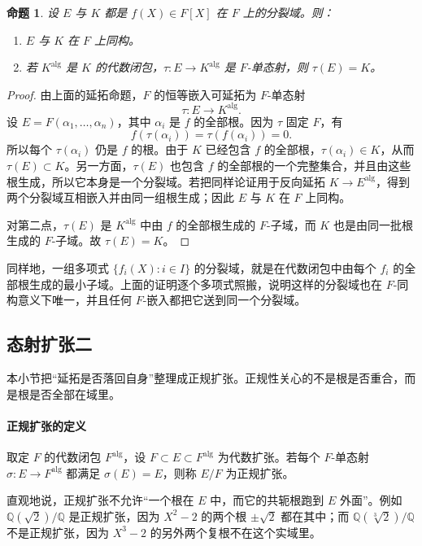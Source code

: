 \documentclass[11pt,a4paper,openany]{ctexbook}
\numberwithin{equation}{chapter}
\newcommand{\Q}{\mathbb{Q}}
\theoremstyle{plain}
\newtheorem{proposition}[theorem]{命题}
\theoremstyle{definition}
\theoremstyle{remark}
\begin{document}
\begin{proposition}
设 $E$ 与 $K$ 都是 $f(X)\in F[X]$ 在 $F$ 上的分裂域。则：
\begin{enumerate}[label=(\arabic*)]
\item $E$ 与 $K$ 在 $F$ 上同构。
\item 若 $K^{\mathrm{alg}}$ 是 $K$ 的代数闭包，$\tau:E\to K^{\mathrm{alg}}$ 是 $F$-单态射，则 $\tau(E)=K$。
\end{enumerate}
\end{proposition}

\begin{proof}
由上面的延拓命题，$F$ 的恒等嵌入可延拓为 $F$-单态射
\[
\tau:E\longrightarrow K^{\mathrm{alg}}.
\]
设 $E=F(\alpha_1,\dots,\alpha_n)$，其中 $\alpha_i$ 是 $f$ 的全部根。因为 $\tau$ 固定 $F$，有
\[
f(\tau(\alpha_i))=\tau(f(\alpha_i))=0.
\]
所以每个 $\tau(\alpha_i)$ 仍是 $f$ 的根。由于 $K$ 已经包含 $f$ 的全部根，$\tau(\alpha_i)\in K$，从而 $\tau(E)\subset K$。另一方面，$\tau(E)$ 也包含 $f$ 的全部根的一个完整集合，并且由这些根生成，所以它本身是一个分裂域。若把同样论证用于反向延拓 $K\to E^{\mathrm{alg}}$，得到两个分裂域互相嵌入并由同一组根生成；因此 $E$ 与 $K$ 在 $F$ 上同构。

对第二点，$\tau(E)$ 是 $K^{\mathrm{alg}}$ 中由 $f$ 的全部根生成的 $F$-子域，而 $K$ 也是由同一批根生成的 $F$-子域。故 $\tau(E)=K$。
\end{proof}

同样地，一组多项式 $\{f_i(X):i\in I\}$ 的分裂域，就是在代数闭包中由每个 $f_i$ 的全部根生成的最小子域。上面的证明逐个多项式照搬，说明这样的分裂域也在 $F$-同构意义下唯一，并且任何 $F$-嵌入都把它送到同一个分裂域。

\subsection{态射扩张二}

本小节把“延拓是否落回自身”整理成正规扩张。正规性关心的不是根是否重合，而是根是否全部在域里。

\paragraph{正规扩张的定义}
取定 $F$ 的代数闭包 $F^{\mathrm{alg}}$，设 $F\subset E\subset F^{\mathrm{alg}}$ 为代数扩张。若每个 $F$-单态射 $\sigma:E\to F^{\mathrm{alg}}$ 都满足 $\sigma(E)=E$，则称 $E/F$ 为正规扩张。

直观地说，正规扩张不允许“一个根在 $E$ 中，而它的共轭根跑到 $E$ 外面”。例如 $\Q(\sqrt2)/\Q$ 是正规扩张，因为 $X^2-2$ 的两个根 $\pm\sqrt2$ 都在其中；而 $\Q(\sqrt[3]{2})/\Q$ 不是正规扩张，因为 $X^3-2$ 的另外两个复根不在这个实域里。
\end{document}
